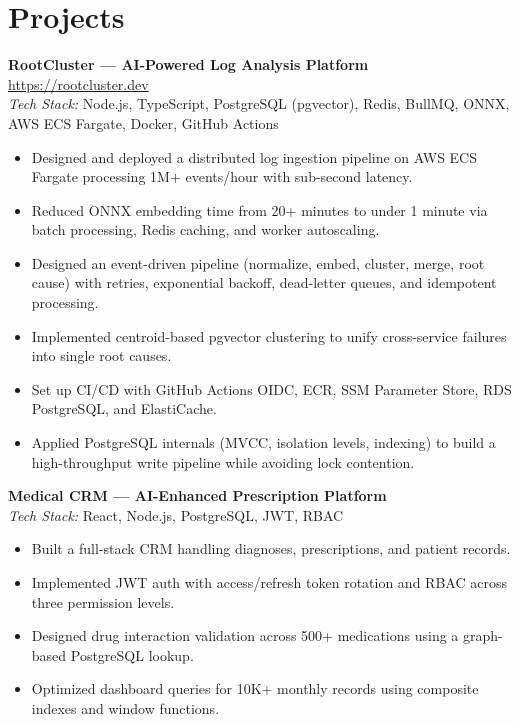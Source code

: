 \documentclass[11pt]{article}
\begin{document}
\section{Projects}
\textbf{RootCluster — AI-Powered Log Analysis Platform} \href{https://rootcluster.dev}{https://rootcluster.dev}\\
\textit{Tech Stack:} Node.js, TypeScript, PostgreSQL (pgvector), Redis, BullMQ, ONNX, AWS ECS Fargate, Docker, GitHub Actions\\
\begin{itemize}
\item Designed and deployed a distributed log ingestion pipeline on AWS ECS Fargate processing 1M+ events/hour with sub-second latency.
\item Reduced ONNX embedding time from 20+ minutes to under 1 minute via batch processing, Redis caching, and worker autoscaling.
\item Designed an event-driven pipeline (normalize, embed, cluster, merge, root cause) with retries, exponential backoff, dead-letter queues, and idempotent processing.
\item Implemented centroid-based pgvector clustering to unify cross-service failures into single root causes.
\item Set up CI/CD with GitHub Actions OIDC, ECR, SSM Parameter Store, RDS PostgreSQL, and ElastiCache.
\item Applied PostgreSQL internals (MVCC, isolation levels, indexing) to build a high-throughput write pipeline while avoiding lock contention.
\end{itemize}

\textbf{Medical CRM — AI-Enhanced Prescription Platform}\\
\textit{Tech Stack:} React, Node.js, PostgreSQL, JWT, RBAC\\
\begin{itemize}
\item Built a full-stack CRM handling diagnoses, prescriptions, and patient records.
\item Implemented JWT auth with access/refresh token rotation and RBAC across three permission levels.
\item Designed drug interaction validation across 500+ medications using a graph-based PostgreSQL lookup.
\item Optimized dashboard queries for 10K+ monthly records using composite indexes and window functions.
\end{itemize}
\end{document}
